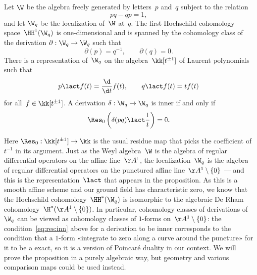 \begin{Proposition}\label{prop:xinner:weyl}
Let $\W$ be the algebra freely generated by letters~$p$ and~$q$ subject to
the relation
  \[
  pq-qp = 1,
  \]
and let $\W_q$ be the localization of~$\W$ at~$q$. The first Hochschild
cohomology space~$\HH^1(\W_q)$ is one-dimensional and is spanned by the
cohomology class of the derivation $\partial:\W_q\to\W_q$ such that
  \[
  \partial(p) = q^{-1}, 
  \qquad
  \partial(q) = 0.
  \]
There is a representation of~$\W_q$ on the algebra~$\kk[t^{\pm1}]$ of
Laurent polynomials such that 
  \[
  p\lact f(t) = \frac{\d}{\d t}f(t),
  \qquad
  q\lact f(t) = tf(t)
  \]
for all~$f\in\kk[t^{\pm1}]$. A derivation $\delta:\W_q\to\W_q$ is inner if
and only if
  \[ \label{eq:res:inn}
  \Res_0\left(\delta(pq)\lact\frac{1}{t}\right) = 0.
  \]
\end{Proposition}

Here $\Res_0:\kk[t^{\pm1}]\to\kk$ is the usual residue map that picks the
coefficient of $t^{-1}$ in its argument. Just as the Weyl algebra~$\W$ is
the algebra of regular differential operators on the affine line~$\AA^1$,
the localization~$\W_q$ is the algebra of regular differential operators on
the punctured affine line~$\AA^1\setminus\{0\}$ --- and this is the
representation~$\lact$ that appears in the proposition. As this is a smooth
affine scheme and our ground field has characteristic zero, we know that
the Hochschild cohomology~$\HH^*(\W_q)$ is isomorphic to the algebraic De
Rham cohomology~$\H^*(\AA^1\setminus\{0\})$. In particular, cohomology
classes of derivations of~$\W_q$ can be viewed as cohomology classes of
$1$-forms on~$\AA^1\setminus\{0\}$: the condition~\eqref{eq:res:inn} above
for a derivation to be inner corresponds to the condition that a $1$-form
«integrate to zero along a curve around the puncture» for it to be a
exact, so it is a version of Poincaré duality in our context. We will prove
the proposition in a purely algebraic way, but geometry and
various comparison maps could be used instead.

